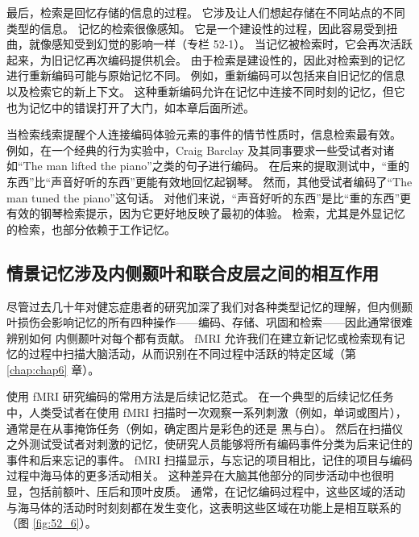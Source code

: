 最后，检索是回忆存储的信息的过程。 它涉及让人们想起存储在不同站点的不同类型的信息。 记忆的检索很像感知。 它是一个建设性的过程，因此容易受到扭曲，就像感知受到幻觉的影响一样（专栏 52-1）。 当记忆被检索时，它会再次活跃起来，为旧记忆再次编码提供机会。 由于检索是建设性的，因此对检索到的记忆进行重新编码可能与原始记忆不同。 例如，重新编码可以包括来自旧记忆的信息以及检索它的新上下文。 这种重新编码允许在记忆中连接不同时刻的记忆，但它也为记忆中的错误打开了大门，如本章后面所述。

当检索线索提醒个人连接编码体验元素的事件的情节性质时，信息检索最有效。 例如，在一个经典的行为实验中，Craig Barclay 及其同事要求一些受试者对诸如“The man lifted the piano”之类的句子进行编码。 在后来的提取测试中，“重的东西”比“声音好听的东西”更能有效地回忆起钢琴。 然而，其他受试者编码了“The man tuned the piano”这句话。 对他们来说，“声音好听的东西”是比“重的东西”更有效的钢琴检索提示，因为它更好地反映了最初的体验。 检索，尤其是外显记忆的检索，也部分依赖于工作记忆。

\subsection{情景记忆涉及内侧颞叶和联合皮层之间的相互作用}
尽管过去几十年对健忘症患者的研究加深了我们对各种类型记忆的理解，但内侧颞叶损伤会影响记忆的所有四种操作——编码、存储、巩固和检索——因此通常很难辨别如何 内侧颞叶对每个都有贡献。 fMRI 允许我们在建立新记忆或检索现有记忆的过程中扫描大脑活动，从而识别在不同过程中活跃的特定区域（第 \ref{chap:chap6} 章）。

使用 fMRI 研究编码的常用方法是后续记忆范式。 在一个典型的后续记忆任务中，人类受试者在使用 fMRI 扫描时一次观察一系列刺激（例如，单词或图片），通常是在从事掩饰任务（例如，确定图片是彩色的还是 黑与白）。 然后在扫描仪之外测试受试者对刺激的记忆，使研究人员能够将所有编码事件分类为后来记住的事件和后来忘记的事件。 fMRI 扫描显示，与忘记的项目相比，记住的项目与编码过程中海马体的更多活动相关。 这种差异在大脑其他部分的同步活动中也很明显，包括前额叶、压后和顶叶皮质。 通常，在记忆编码过程中，这些区域的活动与海马体的活动时时刻刻都在发生变化，这表明这些区域在功能上是相互联系的（图 \ref{fig:52_6}）。

